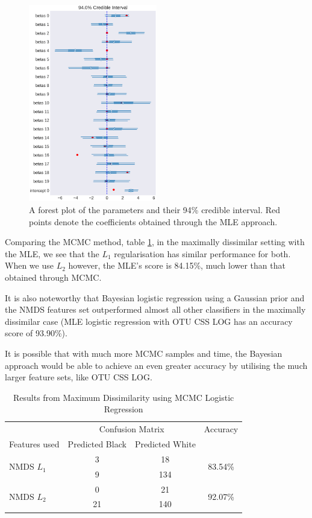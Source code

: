 \begin{figure}[!htb]
	\centering
	\includegraphics[width = 0.5\textwidth]{forest_sim_l1}
	\caption{A forest plot of the parameters and their 94\% credible interval. Red points denote the coefficients obtained through the MLE approach.}
	\label{fig:forest_sim_l1}
\end{figure}

Comparing the MCMC method, table \ref{table:bay_dissim}, in the maximally dissimilar setting with the MLE, we see that the $L_1$ regularisation has similar performance for both. When we use $L_2$ however, the MLE's score is 84.15\%, much lower than that obtained through MCMC. 

It is also noteworthy that Bayesian logistic regression using a Gaussian prior and the NMDS features set outperformed almost all other classifiers in the maximally dissimilar case (MLE logistic regression with OTU CSS LOG has an accuracy score of 93.90\%).



It is possible that with much more MCMC samples and time, the Bayesian approach would be able to achieve an even greater accuracy by utilising the much larger feature sets, like OTU CSS LOG. 

\begin{table}[!htb]
	\centering
	\caption{Results from Maximum Dissimilarity using MCMC Logistic Regression}
	\label{table:bay_dissim}
	\begin{tabular}{l c  c c}
		\toprule
		&\multicolumn{2}{c}{Confusion Matrix} & Accuracy\\
		Features used & Predicted Black&Predicted White&\\
		\midrule
		\multirow{2}{*}{NMDS $L_1$} &3 &18&\multirow{2}{*}{83.54\%}\\
		&	9&134&\\
		\cmidrule{2-3}
		\multirow{2}{*}{NMDS $L_2$} &0&21&\multirow{2}{*}{92.07\%}\\
		&	21&140&\\
		
		\bottomrule
	\end{tabular}
	
\end{table}
